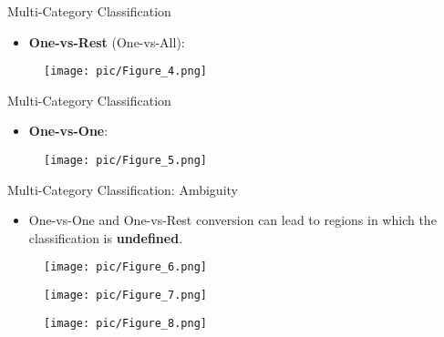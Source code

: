\documentclass[serif, aspectratio=169]{beamer}
\begin{document}
\begin{frame}{Multi-Category Classification}
    \begin{itemize}
        \item \textbf{One-vs-Rest} (One-vs-All):
    \end{itemize}
    \begin{center}
            \begin{figure}[bh]
                \texttt{[image: pic/Figure\_4.png]}
            \end{figure}
        \endminipage
    \end{center}
\end{frame}

\begin{frame}{Multi-Category Classification}
    \begin{itemize}
        \item \textbf{One-vs-One}:
    \end{itemize}
    \begin{center}
            \begin{figure}[bh]
                \texttt{[image: pic/Figure\_5.png]}
            \end{figure}
        \endminipage
    \end{center}
\end{frame}

\begin{frame}{Multi-Category Classification: Ambiguity}
    \begin{itemize}
        \item One-vs-One and One-vs-Rest conversion can lead to regions in which the classification is \textbf{undefined}.
    \end{itemize}
    \begin{figure}[bh]
        \centering
        \texttt{[image: pic/Figure\_6.png]}
    \end{figure}
    \begin{figure}[bh]
        \centering
        \texttt{[image: pic/Figure\_7.png]}
    \end{figure}
    \endminipage
    \hfill
    \begin{figure}[bh]
        \centering
        \texttt{[image: pic/Figure\_8.png]}
    \end{figure}
    \endminipage
\end{frame}
\end{document}
